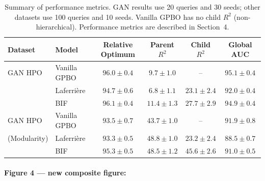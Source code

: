 \begin{table}[h]
\caption{Summary of performance metrics.
GAN results use 20 queries and 30 seeds;
other datasets use 100 queries and 10 seeds.
Vanilla GPBO has no child $R^2$ (non-hierarchical).
Performance metrics are described in Section~4.}
\label{tab:results}
\centering
\small
\begin{tabular}{llcccc}
\toprule
Dataset & Model & Relative Optimum & Parent $R^2$ & Child $R^2$ & Global AUC \\
\midrule
\midrule
GAN HPO         & Vanilla GPBO   & $96.0 \pm 0.4$ & $9.7 \pm 1.0$  & --              & $95.1 \pm 0.4$ \\
                & Laferri\`ere   & $94.7 \pm 0.6$ & $6.8 \pm 1.1$  & $23.1 \pm 2.4$  & $92.0 \pm 0.4$ \\
                & BIF            & $96.1 \pm 0.4$ & $11.4 \pm 1.3$ & $27.7 \pm 2.9$  & $94.9 \pm 0.4$ \\
\midrule
GAN HPO         & Vanilla GPBO   & $93.5 \pm 0.7$ & $43.7 \pm 1.0$ & --              & $91.9 \pm 0.8$ \\
(Modularity)    & Laferri\`ere   & $93.3 \pm 0.5$ & $48.8 \pm 1.0$ & $23.2 \pm 2.4$  & $88.5 \pm 0.7$ \\
                & BIF            & $95.3 \pm 0.5$ & $48.5 \pm 1.2$ & $45.6 \pm 2.6$  & $91.0 \pm 0.5$ \\
\bottomrule
\end{tabular}
\end{table}



\paragraph{Figure 4 --- new composite figure:}

